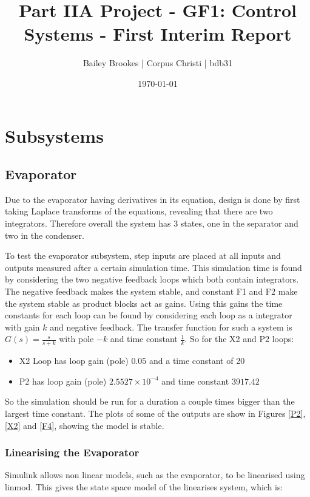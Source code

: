 \documentclass[11pt]{article}
\title{Part IIA Project - GF1: Control Systems - First Interim Report}
\author{Bailey Brookes | Corpus Christi | bdb31}
\date{\today}
\begin{document}
\maketitle

\section{Subsystems}
\subsection{Evaporator}
Due to the evaporator having derivatives in its equation, design is done by first taking Laplace transforms of the equations, revealing that there are two integrators. Therefore overall the system has 3 states, one in the separator and two in the condenser.

To test the evaporator subsystem, step inputs are placed at all inputs and outputs measured after a certain simulation time. This simulation time is found by considering the two negative feedback loops which both contain integrators. The negative feedback makes the system stable, and constant F1 and F2 make the system stable as product blocks act as gains. Using this gains the time constants for each loop can be found by considering each loop as a integrator with gain $k$ and negative feedback. The transfer function for such a system is $G(s) = \frac{s}{s+k}$ with pole $-k$  and time constant $\frac{1}{k}$. So for the X2 and P2 loops:

\begin{itemize}
\item X2 Loop has loop gain (pole) $0.05$ and a time constant of 20 
\item P2 has loop gain (pole) $2.5527 \times 10^{-4}$ and time constant $3917.42$ 
\end{itemize} 

So the simulation should be run for a duration a couple times bigger than the largest time constant. The plots of some of the outputs are show in Figures \ref{P2}, \ref{X2} and \ref{F4}, showing the model is stable.

\subsubsection{Linearising the Evaporator}
Simulink allows non linear models, such as the evaporator, to be linearised using linmod. This gives the state space model of the linearises system, which is:
\end{document}

